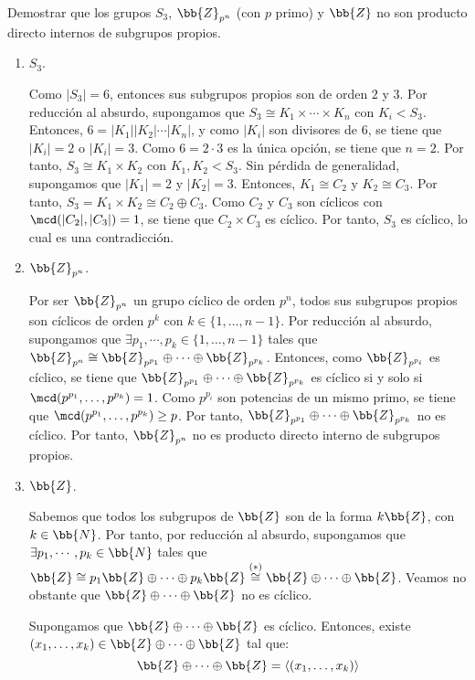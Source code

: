 \begin{ejercicio}
    Demostrar que los grupos $S_3$, $\bb{Z}_{p^n}$ (con $p$ primo) y $\bb{Z}$ no son producto directo internos de subgrupos propios.
    \begin{enumerate}
        \item $S_3$.
        
        Como $|S_3|=6$, entonces sus subgrupos propios son de orden $2$ y $3$. 
        Por reducción al absurdo, supongamos que $S_3\cong K_1\times\cdots\times K_n$ con $K_i<S_3$. Entonces, $6=|K_1||K_2|\cdots|K_n|$, y como $|K_i|$ son divisores de $6$, se tiene que $|K_i|=2$ o $|K_i|=3$. Como $6=2\cdot 3$ es la única opción, se tiene que $n=2$. Por tanto, $S_3\cong K_1\times K_2$ con $K_1,K_2<S_3$. Sin pérdida de generalidad, supongamos que $|K_1|=2$ y $|K_2|=3$. Entonces, $K_1\cong C_2$ y $K_2\cong C_3$. Por tanto, $S_3=K_1\times K_2\cong C_2\oplus C_3$. Como $C_2$ y $C_3$ son cíclicos con $\mcd(|C_2|,|C_3|)=1$, se tiene que $C_2\times C_3$ es cíclico. Por tanto, $S_3$ es cíclico, lo cual es una contradicción.

        \item $\bb{Z}_{p^n}$.
        
        Por ser $\bb{Z}_{p^n}$ un grupo cíclico de orden $p^n$, todos sus subgrupos propios son cíclicos de orden $p^k$ con $k\in \{1,\ldots,n-1\}$. Por reducción al absurdo, supongamos que $\exists p_1,\cdots,p_k\in \{1,\ldots,n-1\}$ tales que $\bb{Z}_{p^n}\cong \bb{Z}_{p^{p_1}}\oplus \cdots \oplus \bb{Z}_{p^{p_k}}$. Entonces, como $\bb{Z}_{p^{p_i}}$ es cíclico, se tiene que $\bb{Z}_{p^{p_1}}\oplus \cdots \oplus \bb{Z}_{p^{p_k}}$ es cíclico si y solo si $\mcd(p^{p_1},\ldots,p^{p_k})=1$. Como $p^{p_i}$ son potencias de un mismo primo, se tiene que $\mcd(p^{p_1},\ldots,p^{p_k})\geq p$. Por tanto, $\bb{Z}_{p^{p_1}}\oplus \cdots \oplus \bb{Z}_{p^{p_k}}$ no es cíclico. Por tanto, $\bb{Z}_{p^n}$ no es producto directo interno de subgrupos propios.

        \item $\bb{Z}$.
        
        Sabemos que todos los subgrupos de $\bb{Z}$ son de la forma $k\bb{Z}$, con $k\in \bb{N}$. Por tanto, por reducción al absurdo, supongamos que $\exists p_1,\cdots,p_k\in \bb{N}$ tales que $\bb{Z}\cong p_1\bb{Z}\oplus \cdots \oplus p_k\bb{Z} \stackrel{(\ast)}{\cong} \bb{Z}\oplus \cdots \oplus \bb{Z}$. Veamos no obstante que $\bb{Z}\oplus \cdots \oplus \bb{Z}$ no es cíclico.
        
        Supongamos que $\bb{Z}\oplus \cdots \oplus \bb{Z}$ es cíclico. Entonces, existe $(x_1,\ldots,x_k)\in \bb{Z}\oplus \cdots \oplus \bb{Z}$ tal que:
        \begin{equation*}
            \bb{Z}\oplus \cdots \oplus \bb{Z} = \langle (x_1,\ldots,x_k)\rangle
        \end{equation*}


\end{enumerate}
\end{ejercicio}
